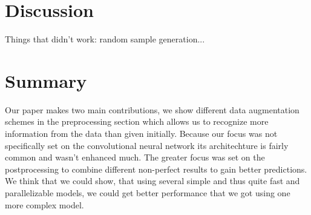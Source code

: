 \documentclass[10pt,conference,compsocconf]{IEEEtran}
\begin{document}
\section{Discussion}
Things that didn't work: random sample generation...


\section{Summary}
Our paper makes two main contributions, we show different data augmentation schemes in the preprocessing section which allows us to recognize more information from the data than given initially. Because our focus was not specifically set on the convolutional neural network its architechture is fairly common and wasn't enhanced much. The greater focus was set on the postprocessing to combine different non-perfect results to gain better predictions. We think that we could show, that using several simple and thus quite fast and parallelizable models, we could get better performance that we got using one more complex model.



\end{document}
